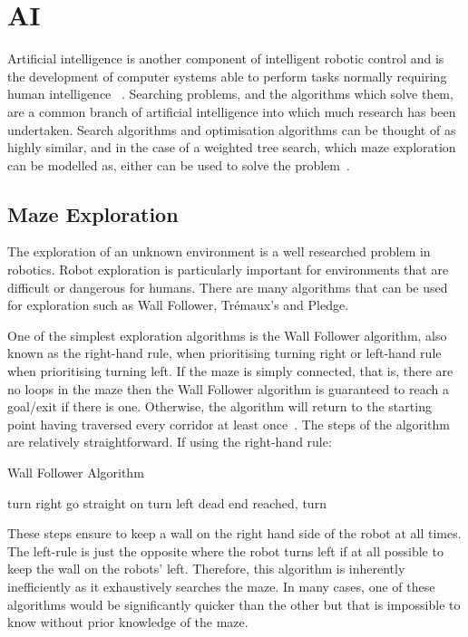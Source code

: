 \section{AI}\label{litreview/maze}
Artificial intelligence is another component of intelligent robotic control and is the 
development of computer systems able to perform tasks normally requiring human intelligence~
\cite{russell2016artificial}. Searching problems, and the algorithms which solve them, are a 
common branch of artificial intelligence into which much research has been undertaken. Search 
algorithms and optimisation algorithms can be thought of as highly similar, and in the case of 
a weighted tree search, which maze exploration can be modelled as, either can be used to solve the problem~\cite{kanal2012search}. 

\subsection{Maze Exploration}\label{litreview/maze/exploration}
The exploration of an unknown environment is a well researched problem in 
robotics. Robot exploration is particularly important for 
environments that are difficult or dangerous for humans. There are many
algorithms that can be used for exploration such as Wall Follower, 
Trémaux's and Pledge.

One of the simplest exploration algorithms is the Wall Follower algorithm, 
also known as the right-hand rule, when prioritising turning right or 
left-hand rule when prioritising turning left. If the maze is simply 
connected, that is, there are no loops in the maze then the Wall Follower 
algorithm is guaranteed to reach a goal/exit if there is one. Otherwise, the 
algorithm will return to the starting point having traversed every corridor at 
least once~\cite{wallFollowerArcBotics}. The steps of the algorithm are 
relatively straightforward. If using the right-hand rule:

\begin{algorithm}
\caption{Wall Follower Algorithm}
\begin{algorithmic}
\REPEAT
{}
  \STATE turn right
  \STATE go straight on
  \STATE turn left
\ELSE
  \STATE dead end reached, turn 
\ENDIF
{}

\end{algorithmic}
\end{algorithm}

These steps ensure to keep a wall on the right hand side of the robot at 
all times. The left-rule is just the opposite where the robot turns left 
if at all possible to keep the wall on the robots' left. Therefore,
this algorithm is inherently inefficiently as it exhaustively searches the
maze. In many cases, one of these algorithms would be significantly quicker
than the other but that is impossible to know without prior knowledge of 
the maze.

